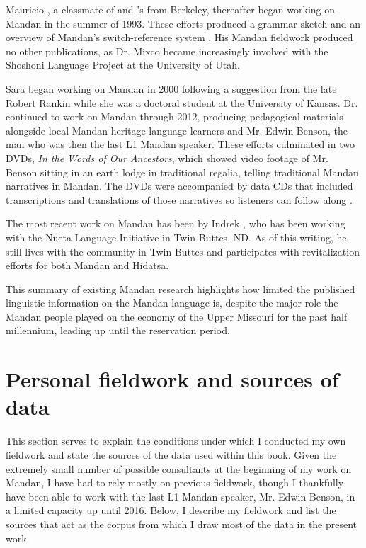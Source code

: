 Mauricio \citeauthor{mixco1997a}, a classmate of \citeauthor{parks1976} and \citeauthor{hollow1970}'s from Berkeley, thereafter began working on Mandan in the summer of 1993. These efforts produced a grammar sketch \citep{mixco1997a} and an overview of Mandan's switch-reference system \citep{mixco1997b}. His Mandan fieldwork produced no other publications, as Dr. Mixco became increasingly involved with the Shoshoni Language Project at the University of Utah.

Sara \citeauthor{trechter2012} began working on Mandan in 2000 following a suggestion from the late Robert Rankin while she was a doctoral student at the University of Kansas. Dr. \citeauthor{trechter2012} continued to work on Mandan through 2012, producing pedagogical materials alongside local Mandan heritage language learners and Mr. Edwin Benson, the man who was then the last L1 Mandan speaker. These efforts culminated in two DVDs, \textit{In the Words of Our Ancestors}, which showed video footage of Mr. Benson sitting in an earth lodge in traditional regalia, telling traditional Mandan narratives in Mandan. The DVDs were accompanied by data CDs that included transcriptions and translations of those narratives so listeners can follow along \citep{trechter2012}.

The most recent work on Mandan has been by Indrek \citeauthor{park2012}, who has been working with the Nueta Language Initiative in Twin Buttes, ND. As of this writing, he still lives with the community in Twin Buttes and participates with revitalization efforts for both Mandan and Hidatsa.

This summary of existing Mandan research highlights how limited the published linguistic information on the Mandan language is, despite the major role the Mandan people played on the economy of the Upper Missouri for the past half millennium, leading up until the reservation period.

\section{Personal fieldwork and sources of data}\label{fieldwork}

This section serves to explain the conditions under which I conducted my own fieldwork and state the sources of the data used within this book. Given the extremely small number of possible consultants at the beginning of my work on Mandan, I have had to rely mostly on previous fieldwork, though I thankfully have been able to work with the last L1 Mandan speaker, Mr. Edwin Benson, in a limited capacity up until 2016. Below, I describe my fieldwork and list the sources that act as the corpus from which I draw most of the data in the present work.

